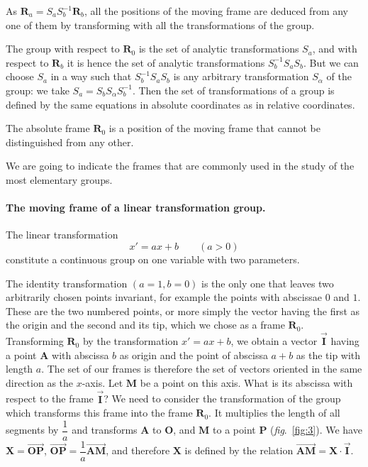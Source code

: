 \documentclass[leqno,11pt]{book}
\numberwithin{equation}{chapter}
\theoremstyle{shape1}
\theoremstyle{shapesmall}
\newcommand{\rvec}[1]{\vec{\mathbf{#1}}}
\newcommand{\ivec}{\rvec{I}}
\begin{document}
As $\mathbf{R}_{a}=S_{a}S_{b}^{-1}\mathbf{R}_{b}$, all the positions of the moving frame are deduced from any one of them by transforming with all the transformations of the group.

The group with respect to $\mathbf{R}_{0}$ is the set of analytic transformations $S_{a}$, and with respect to $\mathbf{R}_{b}$ it is hence the set of analytic transformations $S_{b}^{-1}S_{a}S_{b}$. But we can choose $S_{a}$ in a way such that $S_{b}^{-1}S_{a}S_{b}$ is any arbitrary transformation $S_{\alpha}$ of the group: we take $S_{a}=S_{b}S_{\alpha}S_{b}^{-1}$. Then the set of transformations of a group is defined by the same equations in absolute coordinates as in relative coordinates.

The absolute frame $\mathbf{R}_{0}$ is a position of the moving frame that cannot be distinguished from any other.

We are going to indicate the frames that are commonly used in the study of the most elementary groups.

\paragraph{The moving frame of a linear transformation group.}
\label{sec:64}
The linear transformation\[
x'=ax+b\qquad(a>0)
\]
constitute a continuous group on one variable with two parameters.

The identity transformation $(a=1,b=0)$ is the only one that leaves two arbitrarily chosen points invariant, for example the points with abscissae $0$ and $1$. These are the two numbered points, or more simply the vector having the first as the origin and the second and its tip, which we chose as a frame $\mathbf{R}_{0}$. Transforming $\mathbf{R}_{0}$ by the transformation $x'=ax+b$, we obtain a vector $\ivec$ having a point $\mathbf{A}$ with abscissa $b$ as origin and the point of abscissa $a+b$ as the tip with length $a$. The set of our frames is therefore the set of vectors oriented in the same direction as the $x$-axis. Let $\mathbf{M}$ be a point on this axis. What is its abscissa with respect to the frame $\ivec$? We need to consider the transformation of the group which transforms this frame into the frame $\mathbf{R}_{0}$. It multiplies the length of all segments by $\dfrac{1}{a}$ and transforms $\mathbf{A}$ to $\mathbf{O}$, and $\mathbf{M}$ to a point $\mathbf{P}$ (\emph{fig}.~\ref{fig:3}). We have $\mathbf{X}=\overrightarrow{\mathbf{OP}}$, $\overrightarrow{\mathbf{\mathbf{OP}}}=\dfrac{1}{a}\overrightarrow{\mathbf{AM}}$, and therefore $\mathbf{X}$ is defined by the relation $\overrightarrow{\mathbf{AM}}=\mathbf{X}\cdot\ivec$.
\end{document}
